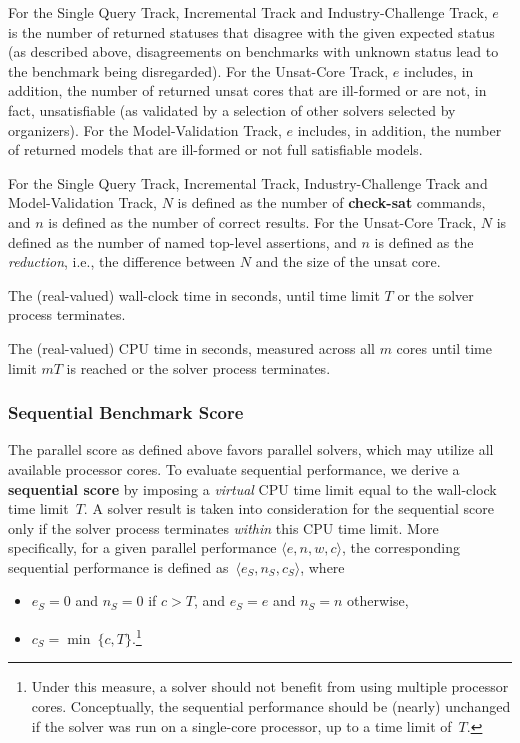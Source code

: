 \documentclass[12pt]{article}
\newcommand{\akey}[1]{\textbf{#1}\xspace}
\newcommand{\maintrack}{Single Query Track\xspace}
\newcommand{\inctrack}{Incremental Track\xspace}
\newcommand{\ucoretrack}{Unsat-Core Track\xspace}
\newcommand{\mvaltrack}{Model-Validation Track\xspace}
\newcommand{\challtrack}{Industry-Challenge Track\xspace}
\begin{document}
For the \maintrack, \inctrack and \challtrack, $e$ is the number of returned
statuses that disagree with the given expected status (as described above,
disagreements on benchmarks with unknown status lead to the benchmark being
disregarded). For the \ucoretrack, $e$ includes, in addition, the number of
returned unsat cores that are ill-formed or are not, in fact, unsatisfiable (as
validated by a selection of other solvers selected by organizers).  For the
\mvaltrack, $e$ includes, in addition, the number of returned models that are
ill-formed or not full satisfiable models.

For the \maintrack, \inctrack, \challtrack and \mvaltrack,
$N$ is defined as the number of \akey{check-sat} commands, and
$n$ is defined as the number of correct results.
For the \ucoretrack, $N$ is defined as the number of named top-level assertions,
and $n$ is defined as the \emph{reduction}, i.e., the difference between $N$
and the size of the unsat core.

The (real-valued) wall-clock time in seconds, until time limit $T$ or the
solver process terminates.

The (real-valued) CPU time in seconds, measured across all $m$ cores
until time limit $mT$ is reached or the solver process
terminates.

\subsubsection{Sequential Benchmark Score}
\label{sec:sequential}

The parallel score as defined above favors parallel solvers, which may utilize
all available processor cores.  To evaluate sequential performance, we derive a
\textbf{sequential score} by imposing a \emph{virtual} CPU time limit equal to
the wall-clock time limit~$T$.  A solver result is taken into consideration for
the sequential score only if the solver process terminates \emph{within} this
CPU time limit.  More specifically, for a given parallel performance $\langle
e, n, w, c\rangle$, the corresponding sequential performance is defined
as~$\langle e_S, n_S, c_S\rangle$, where
\begin{itemize}
\item $e_S = 0$ and $n_S = 0$ if $c > T$, and $e_S = e$ and $n_S = n$
  otherwise,
\item $c_S = \min\ \{c, T\}$.\footnote{Under this
  measure, a solver should not benefit from using multiple processor
  cores.  Conceptually, the sequential performance should be (nearly)
  unchanged if the solver was run on a single-core processor, up to a
  time limit of~$T$.}
\end{itemize}
\end{document}
